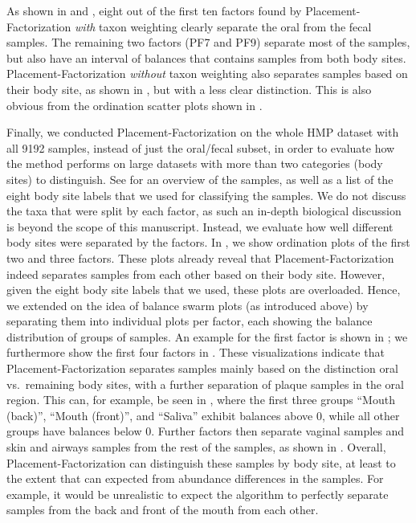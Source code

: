 As shown in  and ,
eight out of the first ten factors found by Placement-Factorization \emph{with} taxon weighting
clearly separate the oral from the fecal samples.
The remaining two factors (PF7 and PF9) separate most of the samples,
but also have an interval of balances that contains samples from both body sites.
Placement-Factorization \emph{without} taxon weighting also separates samples based on their body site,
as shown in ,
but with a less clear distinction.
This is also obvious from the ordination scatter plots
shown in .

Finally, we conducted Placement-Factorization on the whole \ac{HMP} dataset with all \num{9192} samples,
instead of just the oral/fecal subset,
in order to evaluate how the method performs on large datasets with more than two categories (body sites) to distinguish.
See  for an overview of the samples, as well as a list of the eight body site labels
that we used for classifying the samples.
We do not discuss the taxa that were split by each factor,
as such an in-depth biological discussion is beyond the scope of this manuscript.
Instead, we evaluate how well different body sites were separated by the factors.
In , we show ordination plots of the first two and three factors.
These plots already reveal that Placement-Factorization indeed separates samples from each other based on their body site.
However, given the eight body site labels that we used, these plots are overloaded.
Hence, we extended on the idea of balance swarm plots (as introduced above)
by separating them into individual plots per factor, each showing the balance distribution of groups of samples.
An example for the first factor is shown in ;
we furthermore show the first four factors in .
These visualizations indicate that Placement-Factorization separates samples
mainly based on the distinction oral vs.~remaining body sites,
with a further separation of plaque samples in the oral region.
This can, for example, be seen in ,
where the first three groups ``Mouth (back)'', ``Mouth (front)'', and ``Saliva'' exhibit balances above \num{0},
while all other groups have balances below \num{0}.
Further factors then separate vaginal samples and skin and airways samples from the rest of the samples,
as shown in .
Overall, Placement-Factorization can distinguish these samples by body site,
at least to the extent that can expected from abundance differences in the samples.
For example, it would be unrealistic to expect the algorithm to perfectly separate samples
from the back and front of the mouth from each other.

